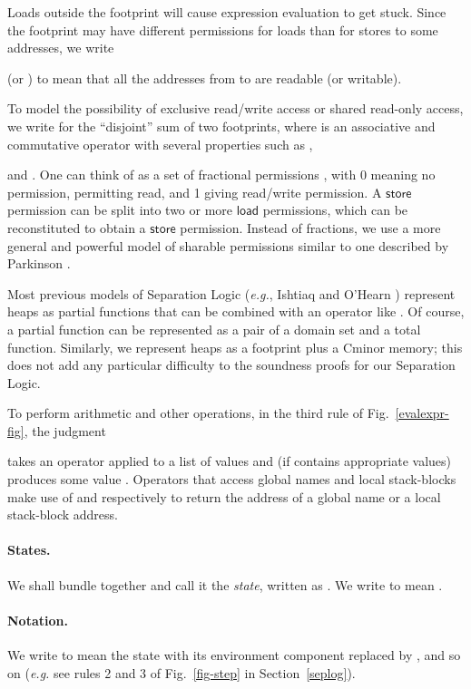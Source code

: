 \documentclass{llncs}
\newcommand{\cminor}{Cminor}
\newcommand{\tyface}[1]{\ensuremath{\mathsf{#1}}}
\begin{document}
Loads outside
the footprint will cause expression evaluation to get stuck.
Since the footprint may have different permissions for
loads than for stores to some addresses, we write 

(or )
to mean that all the addresses from  to
 are 
readable (or writable).


To model the possibility of exclusive read/write access or
shared read-only access, we write 
for the ``disjoint'' sum of two footprints, 
where  is an associative and commutative 
operator with several properties such as
,

and
.
One can think of  as a set of fractional permissions
\cite{bornat05:popl},
with 0 meaning no permission,  permitting read,
and 1 giving read/write permission.
A \tyface{store} permission can be split into
two or more \tyface{load} permissions,
which can be reconstituted to obtain a \tyface{store} permission.
Instead of fractions, we use a more general and powerful model of sharable 
permissions similar to one described by 
Parkinson \cite[Ch.~5]{parkinson05:phd}.

Most previous models of Separation Logic (\textit{e.g.}, Ishtiaq and O'Hearn
\cite{ishtiaq01}) represent heaps as partial functions
that can be combined with an operator like .  Of course,
a partial function can be represented as a pair of a domain set and
a total function.  Similarly, we represent heaps as a footprint plus a 
\cminor{} memory; this does not add any particular difficulty to the soundness proofs for
our Separation Logic.

To perform arithmetic and other operations,
in the third rule of Fig.~\ref{evalexpr-fig}, the judgment

takes an operator  applied to a list of values 
and (if  contains appropriate values)
produces some value .  
Operators 
that access global names and local stack-blocks
make use of  and  respectively to
return the address of a global name or a local stack-block 
address.

\paragraph{States.}
We shall bundle together 
and call it the \emph{state}, written as .
We write  to mean
.

\paragraph{Notation.}
We write  to mean the state 
with its environment component  replaced by , and so on
(\textit{e.g.} see rules 2 and 3 of Fig.~\ref{fig-step} in Section~\ref{seplog}).
\end{document}
